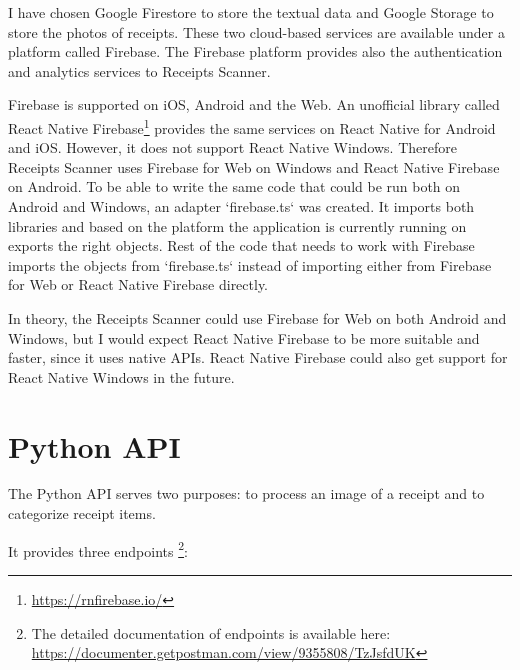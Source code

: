\documentclass[
  digital, %
  table,   %
  oneside, %
  lof,     %
  lot,     %
]{fithesis3}
\DeclareRobustCommand{\thinskip}{\hskip 0.16667em\relax}
\def\emdash{---}
\def\dosh#1#2{\unskip#1\thinskip#2\thinskip\ignorespaces}
\def\Dash{\dosh\nobreak\emdash}
\begin{document}
I have chosen Google Firestore to store the textual data and Google Storage to store the photos of receipts. These two cloud-based services are available under a platform called Firebase. The Firebase platform provides also the authentication and analytics services to Receipts Scanner.

Firebase is supported on iOS, Android and the Web. An unofficial library called React Native Firebase\footnote{\url{https://rnfirebase.io/}} provides the same services on React Native for Android and iOS. However, it does not support React Native Windows. Therefore Receipts Scanner uses Firebase for Web on Windows and React Native Firebase on Android. To be able to write the same code that could be run both on Android and Windows, an adapter `firebase.ts` was created. It imports both libraries and based on the platform the application is currently running on exports the right objects. Rest of the code that needs to work with Firebase imports the objects from `firebase.ts` instead of importing either from Firebase for Web or React Native Firebase directly.

In theory, the Receipts Scanner could use Firebase for Web on both Android and Windows, but I would expect React Native Firebase to be more suitable and faster, since it uses native APIs. React Native Firebase could also get support for React Native Windows in the future.

\section{Python API}
The Python API serves two purposes: to process an image of a receipt and to categorize receipt items.

It provides three endpoints \footnote{The detailed documentation of endpoints is available here: \url{https://documenter.getpostman.com/view/9355808/TzJsfdUK}}:

\end{document}

